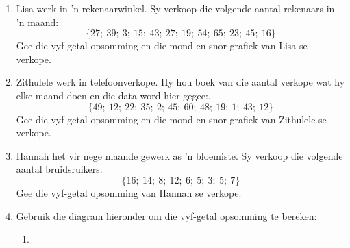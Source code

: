 \begin{exercises}{}{
    \begin{enumerate} [itemsep=6pt, label=\textbf{\arabic*}.]

    \item Lisa werk in ’n rekenaarwinkel. Sy verkoop die volgende aantal rekenaars in ’n maand:
      \begin{equation*}
        \{27;\ 39;\ 3;\ 15;\ 43;\ 27;\ 19;\ 54;\ 65;\ 23;\ 45;\ 16\}
      \end{equation*}
     Gee die vyf-getal opsomming en die mond-en-snor grafiek van Lisa se verkope.

    \item Zithulele werk in telefoonverkope. Hy hou boek van die aantal verkope wat hy elke maand doen en die data word hier gegee:.
      \begin{equation*}
        \{49;\ 12;\ 22;\ 35;\ 2;\ 45;\ 60;\ 48;\ 19;\ 1;\ 43;\ 12\}
      \end{equation*}
    Gee die vyf-getal opsomming en die mond-en-snor grafiek van Zithulele se verkope.

    \item Hannah het vir nege maande gewerk as ’n bloemiste. Sy verkoop die volgende aantal bruidsruikers:
      \begin{equation*}
        \{16;\ 14;\ 8;\ 12;\ 6;\ 5;\ 3;\ 5;\ 7\}
      \end{equation*}
      Gee die vyf-getal opsomming van Hannah se verkope.
    \item Gebruik die diagram hieronder om die vyf-getal opsomming te bereken:
      \begin{enumerate}[noitemsep, label=\textbf{(\alph*)} ]
      \item {}
\end{enumerate}
\end{enumerate}}
\end{exercises}
